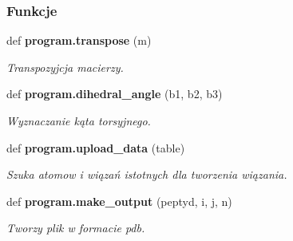 \subsubsection*{Funkcje}
\begin{DoxyCompactItemize}
\item 
def \textbf{ program.\+transpose} (m)
\begin{DoxyCompactList}\small\item\em Transpozyjcja macierzy. \end{DoxyCompactList}\item 
def \textbf{ program.\+dihedral\+\_\+angle} (b1, b2, b3)
\begin{DoxyCompactList}\small\item\em Wyznaczanie kąta torsyjnego. \end{DoxyCompactList}\item 
def \textbf{ program.\+upload\+\_\+data} (table)
\begin{DoxyCompactList}\small\item\em Szuka atomow i wiązań istotnych dla tworzenia wiązania. \end{DoxyCompactList}\item 
def \textbf{ program.\+make\+\_\+output} (peptyd, i, j, n)
\begin{DoxyCompactList}\small\item\em Tworzy plik w formacie pdb. \end{DoxyCompactList}\end{DoxyCompactItemize}
